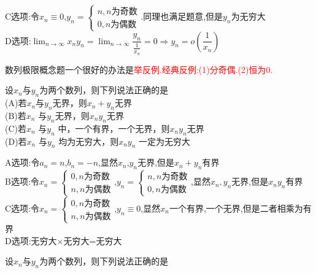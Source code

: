 \documentclass[8pt a4paper, oneside, UTF8]{ctexbook}
\begin{document}
\begin{sloppypar}
\begin{solution}
        C选项:令$x_n \equiv 0$,$y_n=\begin{cases}
            n, n\text{为奇数}\\
            0, n\text{为偶数}
        \end{cases}$.同理也满足题意,但是$y_n$为无穷大\\
        D选项:$\lim_{n \to \infty}x_n y_n=\lim_{n \to \infty} \dfrac{y_n}{\frac{1}{x_n}}=0 \Rightarrow y_n=o(\dfrac{1}{x_n})$
    \end{solution}
    \begin{note}
        数列极限概念题一个很好的办法是\textcolor{red}{举反例.经典反例:(1)分奇偶.(2)恒为0.}
    \end{note}
    \begin{problem}
        设$x_n$与${y_n}$为两个数列，则下列说法正确的是\\
        (A)若$ x_n$与${y_n}$无界，则{$ x_n+y_n$}无界\\
        (B)若$x_n$ 与${y_n}$无界，则{$x_ny_n$}无界\\
        (C)若${x_n}$ 与${y_n}$ 中，一个有界，一个无界，则{$x_ny_n$}无界\\
        (D)若$x_n$ 与$ y_n$ 均为无穷大，则$ x_ny_n$ 一定为无穷大
    \end{problem}
    \begin{solution}
        A选项:令$a_n=n$,$b_n=-n$,显然$x_n$,$y_n$无界,但是$x_n+y_n$有界\\
        B选项:令$x_n=\begin{cases}
            0, n\text{为奇数}\\
            n,n\text{为偶数}
        \end{cases}$,$y_n=\begin{cases}
            n,n\text{为奇数}\\
            0, n\text{为偶数}
        \end{cases}$,显然$x_n,y_n$无界,但是$x_n y_n$有界\\
        C选项:令$x_n=\begin{cases}
            0, n\text{为奇数}\\
            n,n\text{为偶数}
        \end{cases}$,$y_n \equiv 0$,显然$x_n$一个有界,一个无界,但是二者相乘为有界\\
        D选项:无穷大$\times$无穷大=无穷大
    \end{solution}
    \begin{problem}
        设$x_n$与${y_n}$为两个数列，则下列说法正确的是\\

\end{problem}
\end{sloppypar}
\end{document}
